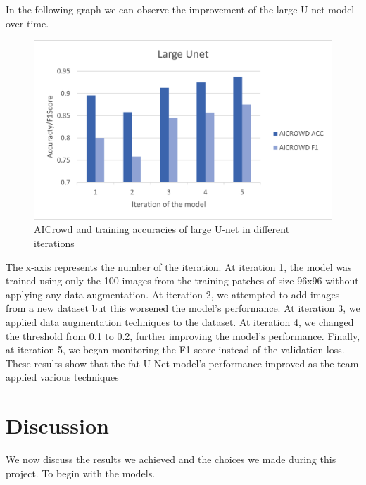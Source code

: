 \documentclass[10pt,conference,compsocconf]{IEEEtran}
\begin{document}
In the following graph we can observe the improvement of the large U-net model over time.
\begin{figure}[H]
    \centering
    \includegraphics[scale = 0.4]{report_images/fatunet_progression.png} %
    \caption{AICrowd and training accuracies of large U-net in different iterations}
\end{figure}
The x-axis represents the number of the iteration. At iteration 1, the model was trained using only the 100 images from the training patches of size 96x96 without applying any data augmentation. At iteration 2, we attempted to add images from a new dataset but this worsened the model's performance. At iteration 3, we applied data augmentation techniques to the dataset. At iteration 4, we changed the threshold from 0.1 to 0.2, further improving the model's performance. Finally, at iteration 5, we began monitoring the F1 score instead of the validation loss. These results show that the fat U-Net model's performance improved as the team applied various techniques
\section{Discussion}
We now discuss the results we achieved and the choices we made during this project. To begin with the models. 
\end{document}
